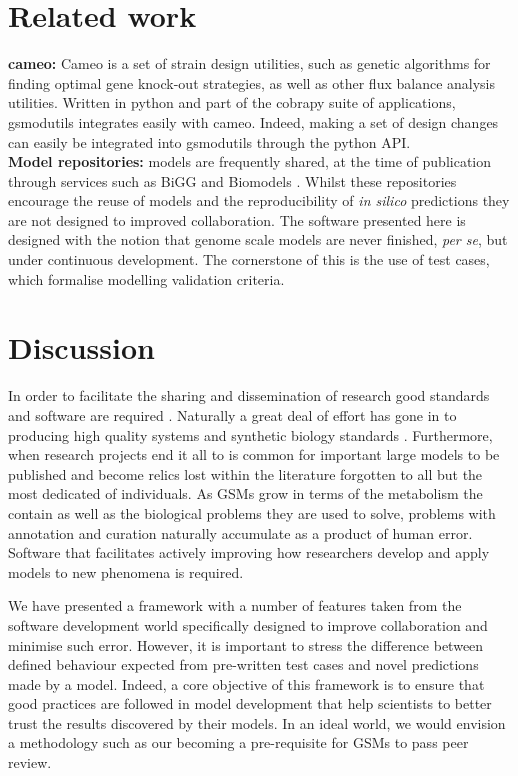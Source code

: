 \documentclass[a4paper,10pt]{article}
\begin{document}
\section{Related work}
\textbf{cameo:} Cameo \cite{cardoso2017cameo} is a set of strain design utilities, such as genetic algorithms for finding optimal gene knock-out
strategies, as well as other flux balance analysis utilities. Written in python and part of the cobrapy suite of applications,
gsmodutils integrates easily with cameo.
Indeed, making a set of design changes can easily be integrated into gsmodutils through the python API.
\\
\textbf{Model repositories:} models are frequently shared, at the time of publication through services such as BiGG \cite{king2015bigg} and Biomodels \cite{chelliah2013biomodels}. 
Whilst these repositories encourage the reuse of models and the reproducibility of \textit{in silico} predictions they are not designed to improved collaboration.
The software presented here is designed with the notion that genome scale models are never finished, \textit{per se}, but under continuous development.
The cornerstone of this is the use of test cases, which formalise modelling validation criteria.


\section{Discussion}
In order to facilitate the sharing and dissemination of research good standards and software are required \cite{}.
Naturally a great deal of effort has gone in to producing high quality systems and synthetic biology standards \cite{}.
Furthermore, when research projects end it all to is common for important large models to be published and become relics lost within the literature forgotten to all but the most dedicated of individuals.
As GSMs grow in terms of the metabolism the contain as well as the biological problems they are used to solve, problems with annotation and curation naturally accumulate as a product of human error.
Software that facilitates actively improving how researchers develop and apply models to new phenomena is required.

We have presented a framework with a number of features taken from the software development world specifically designed to improve collaboration and minimise such error.
However, it is important to stress the difference between defined behaviour expected from pre-written test cases and novel predictions made by a model.
Indeed, a core objective of this framework is to ensure that good practices are followed in model development that help scientists to better trust the results discovered by their models.
In an ideal world, we would envision a methodology such as our becoming a pre-requisite for GSMs to pass peer review.
\end{document}
